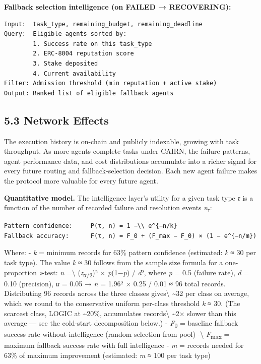 \documentclass[
  10pt,
]{article}
\begin{document}
\textbf{Fallback selection intelligence (on FAILED → RECOVERING):}

\begin{verbatim}
Input:  task_type, remaining_budget, remaining_deadline
Query:  Eligible agents sorted by:
        1. Success rate on this task_type
        2. ERC-8004 reputation score
        3. Stake deposited
        4. Current availability
Filter: Admission threshold (min reputation + active stake)
Output: Ranked list of eligible fallback agents
\end{verbatim}

\hypertarget{network-effects}{%
\subsection{5.3 Network Effects}\label{network-effects}}

The execution history is on-chain and publicly indexable, growing with
task throughput. As more agents complete tasks under CAIRN, the failure
patterns, agent performance data, and cost distributions accumulate into
a richer signal for every future routing and fallback-selection
decision. Each new agent failure makes the protocol more valuable for
every future agent.

\textbf{Quantitative model.} The intelligence layer's utility for a
given task type \emph{τ} is a function of the number of recorded failure
and resolution events \emph{n}\textsubscript{τ}:

\begin{verbatim}
Pattern confidence:     P(τ, n) = 1 −\\ e^{−n/k}
Fallback accuracy:      F(τ, n) = F_0 + (F_max − F_0) × (1 − e^{−n/m})
\end{verbatim}

Where: - \emph{k} = minimum records for 63\% pattern confidence
(estimated: \emph{k} ≈ 30 per task type). The value \emph{k} ≈ 30
follows from the sample size formula for a one-proportion \emph{z}-test:
\emph{n} =\textbackslash{} (\emph{z}\textsubscript{α/2})² ×
\emph{p}(1−\emph{p}) / \emph{d}², where \emph{p} = 0.5 (failure rate),
\emph{d} = 0.10 (precision), \emph{α} = 0.05 → \emph{n} = 1.96² × 0.25 /
0.01 ≈ 96 total records. Distributing 96 records across the three
classes gives\textbackslash{} \textasciitilde32 per class on average,
which we round to the conservative uniform per-class threshold \emph{k}
≈ 30. (The scarcest class, LOGIC at \textasciitilde20\%, accumulates
records\textbackslash{} \textasciitilde2× slower than this average ---
see the cold-start decomposition below.) - \emph{F}\textsubscript{0} =
baseline fallback success rate without intelligence (random selection
from pool) -\textbackslash{} \emph{F}\textsubscript{max} = maximum
fallback success rate with full intelligence - \emph{m} = records needed
for 63\% of maximum improvement (estimated: \emph{m} ≈ 100 per task
type)
\end{document}
